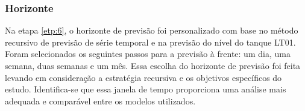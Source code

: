 \subsubsection{Horizonte}

Na etapa \ref{etp:6}, o horizonte de previsão foi personalizado com base no método recursivo de previsão de série temporal e na previsão do nível do tanque LT01. Foram selecionados os seguintes passos para a previsão à frente: um dia, uma semana, duas semanas e um mês. Essa escolha do horizonte de previsão foi feita levando em consideração a estratégia recursiva e os objetivos específicos do estudo. Identifica-se que essa janela de tempo proporciona uma análise mais adequada e comparável entre os modelos utilizados.